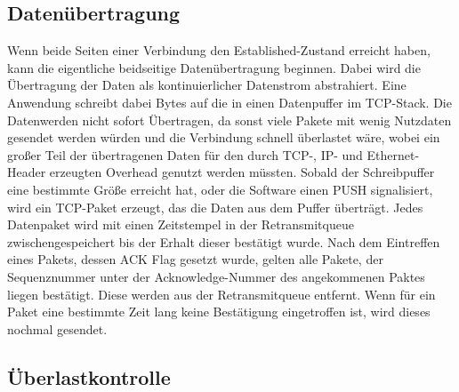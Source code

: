 \subsection{Datenübertragung}

Wenn beide Seiten einer Verbindung den Established-Zustand erreicht haben, kann die eigentliche beidseitige Datenübertragung beginnen. Dabei wird die Übertragung der Daten als kontinuierlicher Datenstrom abstrahiert. Eine Anwendung schreibt dabei Bytes auf die in einen Datenpuffer im TCP-Stack. Die Datenwerden nicht sofort Übertragen, da sonst viele Pakete mit wenig Nutzdaten gesendet werden würden und die Verbindung schnell überlastet wäre, wobei ein großer Teil der übertragenen Daten für den durch TCP-, IP- und Ethernet-Header erzeugten Overhead genutzt werden müssten. Sobald der Schreibpuffer eine bestimmte Größe erreicht hat, oder die Software einen PUSH signalisiert, wird ein TCP-Paket erzeugt, das die Daten aus dem Puffer überträgt. Jedes Datenpaket wird mit einen Zeitstempel in der Retransmitqueue zwischengespeichert bis der Erhalt dieser bestätigt wurde. Nach dem Eintreffen eines Pakets, dessen ACK Flag gesetzt wurde, gelten alle Pakete, der Sequenznummer unter der Acknowledge-Nummer des angekommenen Paktes liegen bestätigt. Diese werden aus der Retransmitqueue entfernt. Wenn für ein Paket eine bestimmte Zeit lang keine Bestätigung eingetroffen ist, wird dieses nochmal gesendet. 

\subsection{Überlastkontrolle}

